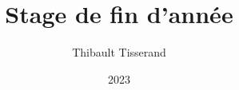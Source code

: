 \documentclass{beamer}
\title{Stage de fin d'année}
\author{Thibault Tisserand}
\institute{Université de Lille}
\date{2023}
\begin{document}
\titlepage


\end{document}
